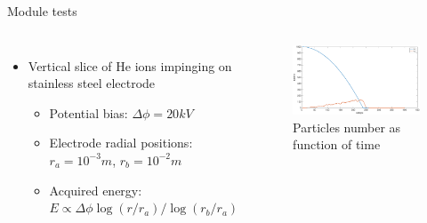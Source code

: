 \documentclass[aspectratio=169,xcolor=dvipsnames,8pt]{beamer}
\begin{document}
 \begin{frame}{Module tests}
     \begin{columns}[c] %

	\begin{itemize}


		\item{Vertical slice of He ions impinging on stainless steel electrode\\
			\begin{itemize}
		
				\item{Potential bias: $\Delta\phi = 20kV$}
				\item{Electrode radial positions: $r_a = 10^{-3}m$, $r_b = 10^{-2}m$ }
				\item{Acquired energy: $E\propto \Delta \phi \log(r/r_a)/\log(r_b/r_a)$} 
				\end{itemize}}
				
						
	\end{itemize}

		\begin{figure}[h!]
		\includegraphics[width=1 \textwidth]{vertslice.eps}
		\caption{\label{img1}  Particles number as function of time}
		\end{figure}
     \end{columns}
\end{frame}
\end{document}
